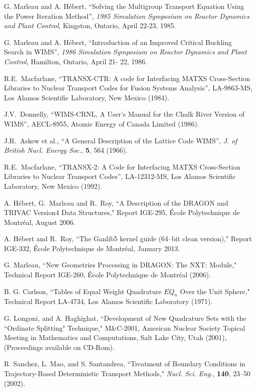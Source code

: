 \begin{thebibliography}{99}
G. Marleau and A. H\'ebert, ``Solving the Multigroup Transport Equation Using the
Power Iteration Method'',  {\sl 1985 Simulation Symposium on Reactor Dynamics and
Plant Control}, Kingston,  Ontario, April 22-23, 1985.

G. Marleau and A. H\'ebert, ``Introduction of an Improved Critical Buckling
Search in WIMS'', {\sl 1986 Simulation Symposium on Reactor Dynamics and Plant
Control}, Hamilton, Ontario, April 21- 22, 1986.

R.E.~Macfarlane, ``TRANSX-CTR: A code for Interfacing MATXS Cross-Section
Libraries to Nuclear  Transport Codes for Fusion Systems Analysis'', LA-9863-MS,
Los Alamos Scientific Laboratory, New  Mexico (1984).

J.V.~Donnelly, ``WIMS-CRNL, A User's Manual for the Chalk River Version of
WIMS'', AECL-8955,  Atomic Energy of Canada Limited (1986).

J.R.~Askew et al., ``A General Description of the Lattice Code WIMS'', {\sl J. of British Nucl. Energy Soc.}, {\bf 5}, 564 (1966).

R.E.~Macfarlane, ``TRANSX-2: A Code for Interfacing MATXS Cross-Section
Libraries to Nuclear Transport Codes'', LA-12312-MS, Los Alamos Scientific
Laboratory, New  Mexico (1992).

A. H\'ebert, G.~Marleau and R.~Roy,
``A Description of the DRAGON and TRIVAC Version4 Data Structures,"
Report IGE-295, \'Ecole Polytechnique de Montr\'eal, August 2006.

A. H\'ebert and R.~Roy,
``The Ganlib5 kernel guide (64--bit clean version),"
Report IGE-332, \'Ecole Polytechnique de Montr\'eal, January 2013.

G. Marleau, ``New Geometries Processing in DRAGON: The NXT: Module," Technical Report IGE-260, \'Ecole 
Polytechnique de Montr\'eal (2006).

B. G. Carlson, ``Tables of Equal Weight Quadrature $EQ_{n}$ Over the Unit Sphere," Technical Report LA-4734, 
Los Alamos Scientific Laboratory (1971).

G. Longoni, and A. Haghighat, ``Development of New Quadrature Sets with the ``Ordinate Splitting" Technique,"
M\&C-2001, American Nuclear Society Topical Meeting in Mathematics and Computations, Salt 
Lake City, Utah (2001), (Proceedings available on CD-Rom). 

R. Sanchez, L. Mao, and S. Santandrea, ``Treatment of Boundary Conditions in Trajectory-Based Deterministic
Transport Methods," {\sl Nucl. Sci. Eng.}, {\bf 140}, 23--50 (2002). 


\end{thebibliography}

